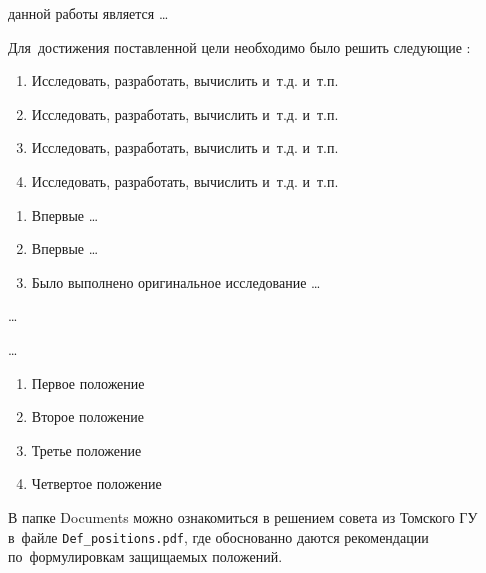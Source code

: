 

{\aim} данной работы является \ldots

Для~достижения поставленной цели необходимо было решить следующие {\tasks}:
\begin{enumerate}
  \item Исследовать, разработать, вычислить и~т.\:д. и~т.\:п.
  \item Исследовать, разработать, вычислить и~т.\:д. и~т.\:п.
  \item Исследовать, разработать, вычислить и~т.\:д. и~т.\:п.
  \item Исследовать, разработать, вычислить и~т.\:д. и~т.\:п.
\end{enumerate}


{\novelty}
\begin{enumerate}
  \item Впервые \ldots
  \item Впервые \ldots
  \item Было выполнено оригинальное исследование \ldots
\end{enumerate}

{\influence} \ldots

{\methods} \ldots

{}
\begin{enumerate}
  \item Первое положение
  \item Второе положение
  \item Третье положение
  \item Четвертое положение
\end{enumerate}
В папке Documents можно ознакомиться в решением совета из Томского ГУ
в~файле \verb+Def_positions.pdf+, где обоснованно даются рекомендации
по~формулировкам защищаемых положений. 

